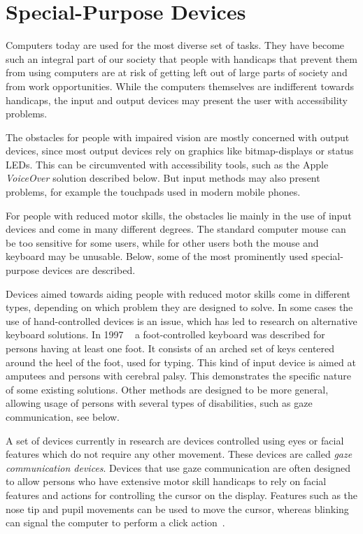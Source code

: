 
\section{Special-Purpose Devices}

Computers today are used for the most diverse set of tasks. They have become such an integral part of our society that people with handicaps that prevent them from using computers are at risk of getting left out of large parts of society and from work opportunities. While the computers themselves are indifferent towards handicaps, the input and output devices may present the user with accessibility problems.

The obstacles for people with impaired vision are mostly concerned with output devices, since most output devices rely on graphics like bitmap-displays or status LEDs. This can be circumvented with accessibility tools, such as the Apple \emph{VoiceOver} solution described below. But input methods may also present problems, for example the touchpads used in modern mobile phones.

For people with reduced motor skills, the obstacles lie mainly in the use of input devices and come in many different degrees. The standard computer mouse can be too sensitive for some users, while for other users both the mouse and keyboard may be unusable. Below, some of the most prominently used special-purpose devices are described.

Devices aimed towards aiding people with reduced motor skills come in different types, depending on which problem they are designed to solve. In some cases the use of hand-controlled devices is an issue, which has led to research on alternative keyboard solutions. In 1997 ~\cite{583209} a foot-controlled keyboard was described for persons having at least one foot. It consists of an arched set of keys centered around the heel of the foot, used for typing. This kind of input device is aimed at amputees and persons with cerebral palsy. This demonstrates the specific nature of some existing solutions. Other methods are designed to be more general, allowing usage of persons with several types of disabilities, such as gaze communication, see below. 

A set of devices currently in research are devices controlled using eyes or facial features which do not require any other movement. These devices are called \emph{gaze communication devices}. Devices that use gaze communication are often designed to allow persons who have extensive motor skill handicaps to rely on facial features and actions for controlling the cursor on the display. Features such as the nose tip and pupil movements can be used to move the cursor, whereas blinking can signal the computer to  perform a click action~\cite{ieee6398171, conf/itng/AraiM11a}.

